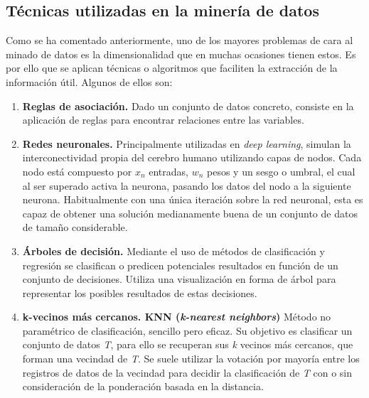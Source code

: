 \subsection{Técnicas utilizadas en la minería de datos}
Como se ha comentado anteriormente, uno de los mayores problemas de cara al minado de datos es la dimensionalidad que en muchas ocasiones tienen estos. Es por ello que se aplican técnicas o algoritmos que faciliten la extracción de la información útil. Algunos de ellos son:
\begin{enumerate}
	\item \textbf{Reglas de asociación.} Dado un conjunto de datos concreto, consiste en la aplicación de reglas para encontrar relaciones entre las variables.
	\item \textbf{Redes neuronales.} Principalmente utilizadas en \textit{deep learning}, simulan la interconectividad propia del cerebro humano utilizando capas de nodos. Cada nodo está compuesto por \(x_n\) entradas, \(w_n\) pesos y un sesgo o umbral, el cual al ser superado activa la neurona, pasando los datos del nodo a la siguiente neurona. Habitualmente con una única iteración sobre la red neuronal, esta es capaz de obtener una solución medianamente buena de un conjunto de datos de tamaño considerable. 
	\item \textbf{Árboles de decisión.} Mediante el uso de métodos de clasificación y regresión se clasifican o predicen potenciales resultados en función de un conjunto de decisiones. Utiliza una visualización en forma de árbol para representar los posibles resultados de estas decisiones.
	\item \textbf{k-vecinos más cercanos. KNN (\textit{k-nearest neighbors})} Método no paramétrico de clasificación, sencillo pero eficaz. \cite{hand2007principles} 
Su objetivo es clasificar un conjunto de datos \textit{T}, para ello se recuperan sus \textit{k} vecinos más cercanos, que forman una vecindad de \textit{T}. Se suele utilizar la votación por mayoría entre los registros de datos de la vecindad para decidir la clasificación de \textit{T} con o sin consideración de la ponderación basada en la distancia. \cite{guo2003knn}
\end{enumerate}

\newpage
